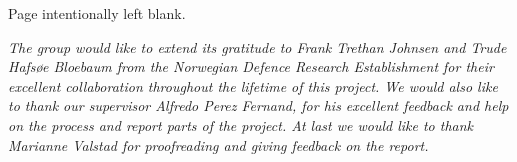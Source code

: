 \vspace*{\fill}
\begin{center}
Page intentionally left blank.
\end{center}
\vspace*{\fill}

\pagebreak

\vspace*{7cm}
\begin{center}

\emph{The group would like to extend its gratitude to Frank Trethan Johnsen and Trude Hafsøe Bloebaum from the Norwegian Defence Research Establishment for their excellent collaboration throughout the lifetime of this project. We would also like to thank our supervisor Alfredo Perez Fernand, for his excellent feedback and help on the process and report parts of the project. At last we would like to thank Marianne Valstad for proofreading and giving feedback on the report.}

\end{center}